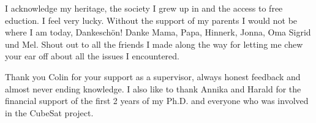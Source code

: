 I acknowledge my heritage, the society I grew up in and the access to free eduction.
I feel very lucky.
Without the support of my parents I would not be where I am today, Dankesch{\"o}n!
Danke Mama, Papa, Hinnerk, Jonna, Oma Sigrid und Mel.
Shout out to all the friends I made along the way for letting me chew your ear off about all the issues I encountered.



Thank you Colin for your support as a supervisor, always honest feedback and almost never ending knowledge.
I also like to thank Annika and Harald for the financial support of the first 2 years of my Ph.D. and everyone who was involved in the CubeSat project.
%
%
%
%
%
